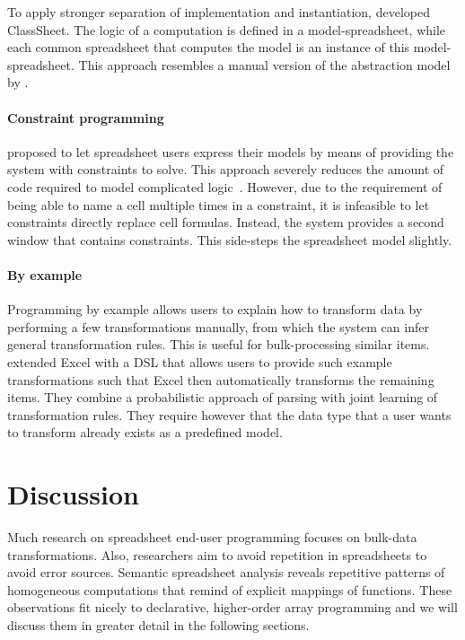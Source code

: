 \documentclass[a4paper]{article}
\begin{document}
To apply stronger separation of implementation and instantiation,
\citet{6070409} developed ClassSheet. The logic of a computation is
defined in a model-spreadsheet, while each common spreadsheet that
computes the model is an instance of this model-spreadsheet. This
approach resembles a manual version of the abstraction model by
\citet{Isakowitz:1995:TLT:195705.195708}.

\paragraph{Constraint programming}

\citet{Stadelmann:1993:SBC:168642.168664} proposed to let spreadsheet
users express their models by means of providing the system with
constraints to solve. This approach severely reduces the amount of
code required to model complicated
logic~\cite{Stadelmann:1993:SBC:168642.168664}. However, due to the
requirement of being able to name a cell multiple times in a
constraint, it is infeasible to let constraints directly replace cell
formulas. Instead, the system provides a second window that contains
constraints. This side-steps the spreadsheet model slightly.

\paragraph{By example}

Programming by example allows users to explain how to transform data
by performing a few transformations manually, from which the system
can infer general transformation rules. This is useful for
bulk-processing similar items. \citet{Singh:2016:TSD:2837614.2837668}
extended Excel with a DSL that allows users to provide such example
transformations such that Excel then automatically transforms the
remaining items. They combine a probabilistic approach of parsing with
joint learning of transformation rules. They require however that the
data type that a user wants to transform already exists as a
predefined model.

\section{Discussion}
\label{sec:discussion}

Much research on spreadsheet end-user programming focuses on bulk-data
transformations. Also, researchers aim to avoid repetition in
spreadsheets to avoid error sources. Semantic spreadsheet analysis
reveals repetitive patterns of homogeneous computations that remind of
explicit mappings of functions. These observations fit nicely to
declarative, higher-order array programming and we will discuss them
in greater detail in the following sections.
\end{document}
